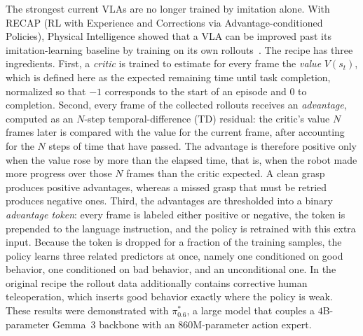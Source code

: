 \documentclass[conference]{IEEEtran}
\begin{document}
The strongest current VLAs are no longer trained by imitation alone. With RECAP (RL with
Experience and Corrections via Advantage-conditioned Policies), Physical Intelligence showed
that a VLA can be improved past its imitation-learning baseline by training on its own
rollouts~\cite{b_recap}. The recipe has three ingredients. First, a \emph{critic} is trained
to estimate for every frame the \emph{value} $V(s_t)$, which is defined here as the expected
remaining time until task completion, normalized so that $-1$ corresponds to the start of an
episode and $0$ to completion. Second, every frame of the collected rollouts receives an
\emph{advantage}, computed as an $N$-step temporal-difference (TD) residual: the critic's
value $N$ frames later is compared with the value for the current frame, after accounting
for the $N$ steps of time that have passed. The advantage is therefore positive only when
the value rose by more than the elapsed time, that is, when the robot made more progress
over those $N$ frames than the critic expected. A clean grasp produces positive advantages, whereas a missed
grasp that must be retried produces negative ones. Third, the advantages are thresholded
into a binary \emph{advantage token}: every frame is labeled either positive or negative,
the token is prepended to the language instruction, and the policy is retrained with this
extra input. Because the token is dropped for a fraction of the training samples, the policy
learns three related predictors at once, namely one conditioned on good behavior, one
conditioned on bad behavior, and an unconditional one. In the original recipe the rollout
data additionally contains corrective human teleoperation, which inserts good behavior
exactly where the policy is weak. These results were demonstrated with $\pi^{*}_{0.6}$, a
large model that couples a $4$B-parameter Gemma~3 backbone with an $860$M-parameter action
expert.
\end{document}

